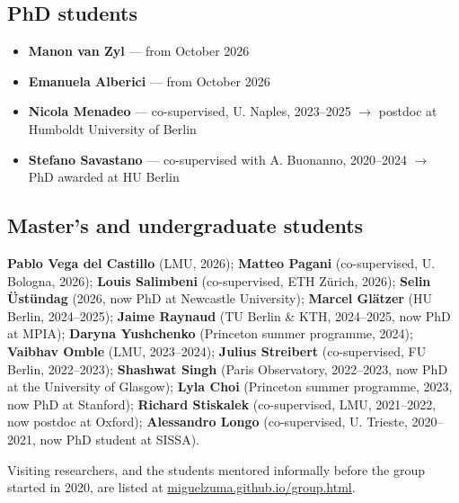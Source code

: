 \documentclass[11pt,a4paper]{article}
\newenvironment{plainlist}
  {\begin{itemize}[leftmargin=1.1em,itemsep=0.2em,parsep=0pt,topsep=0.3em]}
  {\end{itemize}}
\begin{document}
\subsection{PhD students}
\begin{plainlist}
  \item \textbf{Manon van Zyl} --- from October 2026
  \item \textbf{Emanuela Alberici} --- from October 2026
  \item \textbf{Nicola Menadeo} --- co-supervised, U. Naples, 2023--2025 $\rightarrow$ postdoc at Humboldt University of Berlin
  \item \textbf{Stefano Savastano} --- co-supervised with A. Buonanno, 2020--2024 $\rightarrow$ PhD awarded at HU Berlin
\end{plainlist}

\subsection{Master's and undergraduate students}
\textbf{Pablo Vega del Castillo} (LMU, 2026); \textbf{Matteo Pagani} (co-supervised, U. Bologna, 2026);
\textbf{Louis Salimbeni} (co-supervised, ETH Zürich, 2026); \textbf{Selin Üstündag} (2026, now PhD at
Newcastle University); \textbf{Marcel Glätzer} (HU Berlin, 2024--2025); \textbf{Jaime Raynaud}
(TU Berlin \& KTH, 2024--2025, now PhD at MPIA); \textbf{Daryna Yushchenko} (Princeton summer
programme, 2024); \textbf{Vaibhav Omble} (LMU, 2023--2024); \textbf{Julius Streibert} (co-supervised,
FU Berlin, 2022--2023); \textbf{Shashwat Singh} (Paris Observatory, 2022--2023, now PhD at the
University of Glasgow); \textbf{Lyla Choi} (Princeton summer programme, 2023, now PhD at Stanford);
\textbf{Richard Stiskalek} (co-supervised, LMU, 2021--2022, now postdoc at Oxford);
\textbf{Alessandro Longo} (co-supervised, U. Trieste, 2020--2021, now PhD student at SISSA).

\vspace{0.4em}
{\small\color{soft}Visiting researchers, and the students mentored informally before the group
started in 2020, are listed at
\href{https://miguelzuma.github.io/group.html}{miguelzuma.github.io/group.html}.}

\end{document}
